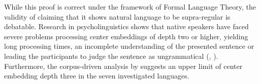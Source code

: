 While this proof is correct under the framework of Formal Language Theory, the validity of claiming that it shows natural language to be supra-regular is debatable. Research in psycholinguistics shows that native speakers have faced severe problems processing center embeddings of depth two or higher, yielding long processing times, an incomplete understanding of the presented sentence or leading the participants to judge the sentence as ungrammatical (\cite{Hamilton1971}, \cite{Frank2016}). Furthermore, the corpus-driven analysis by \cite{Karlsson2007} suggests an upper limit of center embedding depth three in the seven investigated languages.

